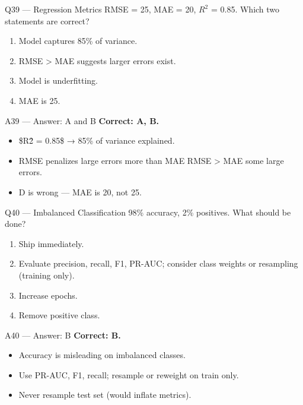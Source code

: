 \documentclass[aspectratio=169,10pt]{beamer}
\begin{document}
	
	\begin{frame}{Q39 — Regression Metrics}
		RMSE = 25, MAE = 20, $R^2$ = 0.85. Which two statements are correct?
		\begin{enumerate}[label=\Alph*.]
			\item Model captures 85\% of variance.
			\item RMSE > MAE suggests larger errors exist.
			\item Model is underfitting.
			\item MAE is 25.
		\end{enumerate}
	\end{frame}
	
	\begin{frame}{A39 — Answer: A and B}
		\textbf{Correct: A, B.}
		\begin{itemize}
			\item \$R\^2 = 0.85\$ → 85\% of variance explained.
			\item RMSE penalizes large errors more than MAE  RMSE > MAE  some large errors.
			\item D is wrong — MAE is 20, not 25.
		\end{itemize}
	\end{frame}
	
	\begin{frame}{Q40 — Imbalanced Classification}
		98\% accuracy, 2\% positives. What should be done?
		\begin{enumerate}[label=\Alph*.]
			\item Ship immediately.
			\item Evaluate precision, recall, F1, PR-AUC; consider class weights or resampling (training only).
			\item Increase epochs.
			\item Remove positive class.
		\end{enumerate}
	\end{frame}
	
	\begin{frame}{A40 — Answer: B}
		\textbf{Correct: B.}
		\begin{itemize}
			\item Accuracy is misleading on imbalanced classes.
			\item Use PR-AUC, F1, recall; resample or reweight on train only.
			\item Never resample test set (would inflate metrics).
		\end{itemize}
	\end{frame}
	
\end{document}
